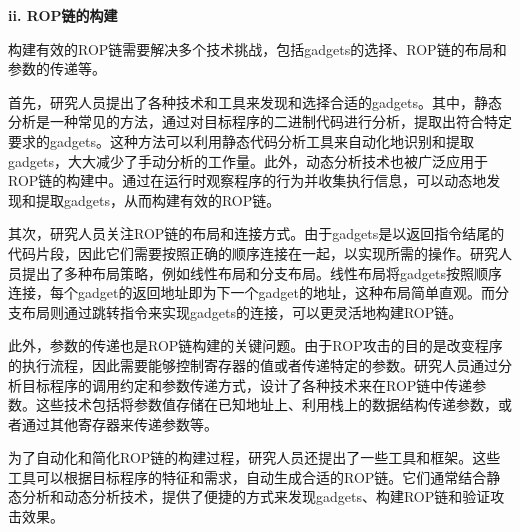\documentclass[UTF8,12pt,a4paper,twoside]{ctexart}
\numberwithin{figure}{section}
\begin{document}
\textbf{ii. ROP链的构建}
\par 构建有效的ROP链需要解决多个技术挑战，包括gadgets的选择、ROP链的布局和参数的传递等。
\par 首先，研究人员提出了各种技术和工具来发现和选择合适的gadgets。其中，静态分析是一种常见的方法，通过对目标程序的二进制代码进行分析，提取出符合特定要求的gadgets。这种方法可以利用静态代码分析工具来自动化地识别和提取gadgets，大大减少了手动分析的工作量。此外，动态分析技术也被广泛应用于ROP链的构建中。通过在运行时观察程序的行为并收集执行信息，可以动态地发现和提取gadgets，从而构建有效的ROP链。
\par 其次，研究人员关注ROP链的布局和连接方式。由于gadgets是以返回指令结尾的代码片段，因此它们需要按照正确的顺序连接在一起，以实现所需的操作。研究人员提出了多种布局策略，例如线性布局和分支布局。线性布局将gadgets按照顺序连接，每个gadget的返回地址即为下一个gadget的地址，这种布局简单直观。而分支布局则通过跳转指令来实现gadgets的连接，可以更灵活地构建ROP链。
\par 此外，参数的传递也是ROP链构建的关键问题。由于ROP攻击的目的是改变程序的执行流程，因此需要能够控制寄存器的值或者传递特定的参数。研究人员通过分析目标程序的调用约定和参数传递方式，设计了各种技术来在ROP链中传递参数。这些技术包括将参数值存储在已知地址上、利用栈上的数据结构传递参数，或者通过其他寄存器来传递参数等。
\par 为了自动化和简化ROP链的构建过程，研究人员还提出了一些工具和框架。这些工具可以根据目标程序的特征和需求，自动生成合适的ROP链。它们通常结合静态分析和动态分析技术，提供了便捷的方式来发现gadgets、构建ROP链和验证攻击效果。\\
\end{document}
